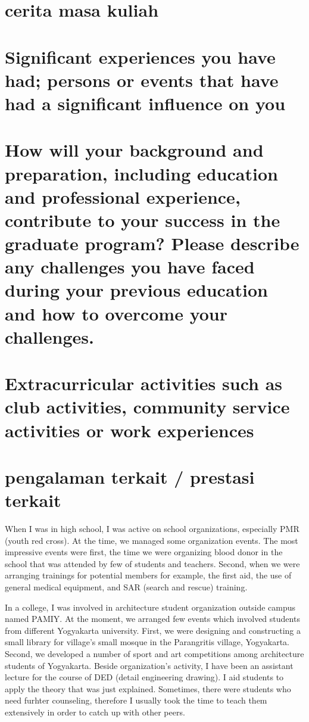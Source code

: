 \documentclass[11pt]{simart} %
\begin{document}
\section*{cerita masa kuliah}

\section{Significant experiences you have had; persons or events that have had a significant influence on you}
\section*{How will your background and preparation, including education and professional experience, contribute to your success in the graduate program? Please describe any challenges you have faced during your previous education and how to overcome your challenges.}

\section{Extracurricular activities such as club activities, community service activities or work experiences}
\section*{pengalaman terkait / prestasi terkait}
When I was in high school, I was active on school organizations, especially PMR (youth red cross). At the time, we managed some organization events. The most impressive events were first, the time we were organizing blood donor in the school that was attended by few of students and teachers. Second, when we were arranging trainings for potential members for example, the first aid, the use of general medical equipment, and SAR (search and rescue) training.

In a college, I was involved in architecture student organization outside campus named PAMIY. At the moment, we arranged few events which involved students from different Yogyakarta university. First, we were designing and constructing a small library for village's small mosque in the Parangritis village, Yogyakarta. Second, we developed a number of sport and art competitions among architecture students of Yogyakarta. Beside organization's activity, I have been an assistant lecture for the course of DED (detail engineering drawing). I aid students to apply the theory that was just explained. Sometimes, there were  students who need furhter counseling, therefore I usually took the time to teach them extensively in order to catch up with other peers.
\end{document}
